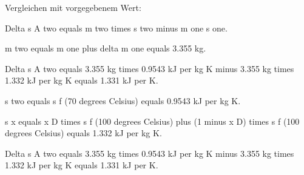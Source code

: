 Vergleichen mit vorgegebenem Wert:

Delta s A two equals m two times s two minus m one s one.

m two equals m one plus delta m one equals 3.355 kg.

Delta s A two equals 3.355 kg times 0.9543 kJ per kg K minus 3.355 kg times 1.332 kJ per kg K equals 1.331 kJ per K.

s two equals s f (70 degrees Celsius) equals 0.9543 kJ per kg K.

s x equals x D times s f (100 degrees Celsius) plus (1 minus x D) times s f (100 degrees Celsius) equals 1.332 kJ per kg K.

Delta s A two equals 3.355 kg times 0.9543 kJ per kg K minus 3.355 kg times 1.332 kJ per kg K equals 1.331 kJ per K.